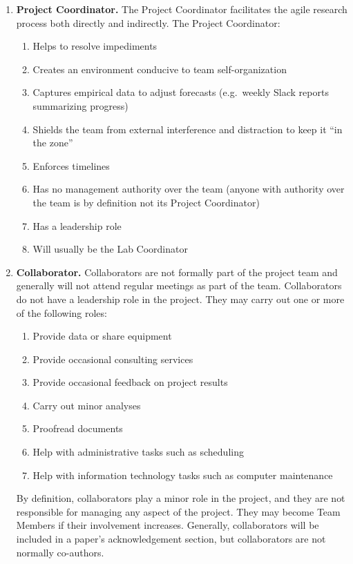 \documentclass{tufte-book} %
\begin{document}
\begin{enumerate}
\item \textbf{Project Coordinator.} The Project Coordinator facilitates
  the agile research process both directly and indirectly. The Project Coordinator:
\begin{enumerate}
\item Helps to resolve impediments 
\item Creates an environment conducive to team self-organization
\item Captures empirical data to adjust forecasts (e.g.\ weekly Slack
  reports summarizing progress)
\item Shields the team from external interference and distraction to
  keep it ``in the zone''
\item Enforces timelines
\item Has no management authority over the team (anyone with authority
  over the team is by definition not its Project
  Coordinator)
\item Has a leadership role
\item Will usually be the Lab Coordinator %
\end{enumerate}

\item \textbf{Collaborator.}  Collaborators are not formally part of
  the project team and generally will not attend regular meetings as
  part of the team.  Collaborators do not have a leadership role in
  the project.  They may carry out one or more of the
  following roles:
\begin{enumerate}
\item Provide data or share equipment 
\item Provide occasional consulting services
\item Provide occasional feedback on project results
\item Carry out minor analyses
\item Proofread documents
\item Help with administrative tasks such as scheduling
\item Help with information technology tasks such as computer
  maintenance

\end{enumerate}
By definition, collaborators play a minor role in the project, and they are not
responsible for managing any aspect of the project.  They may become Team
Members if their involvement increases.  Generally, collaborators will
be included in a paper's acknowledgement section, but collaborators
are not normally co-authors.
\end{enumerate}
\end{document}

